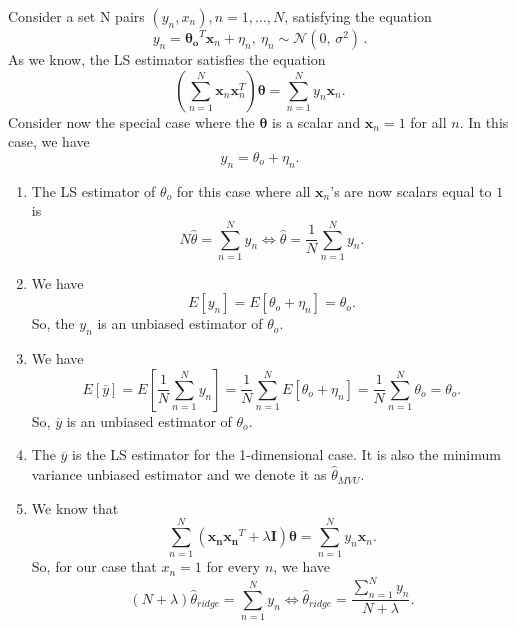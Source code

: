 \documentclass[12pt]{book}
\begin{document}
Consider a set N pairs $(y_n,x_n),n=1,\dots,N$, satisfying the equation
\begin{equation}
y_n = \bm{\theta_o}^T\bm{x}_n + \eta_n, \ \eta_n \sim \mathcal{N}(0,\,\sigma^{2})\,.
\end{equation}
As we know, the LS estimator satisfies the equation 
\begin{equation}
(\sum_{n=1}^{N}\bm{x}_n\bm{x}_n^T)\bm{\theta} = \sum_{n=1}^{N}y_n\bm{x}_n.
\end{equation}
Consider now the special case where the $\bm{\theta}$ is a scalar and $\bm{x}_n=1$ for all $n$. In this case, we have
\begin{equation}
y_n = \theta_o + \eta_n.
\end{equation}
\begin{enumerate}[label=(\alph*)]
	\item The LS estimator of $\theta_o$ for this case where all $\bm{x}_n$'s are now scalars equal to $1$ is
	\begin{equation*}
	N\hat{\theta} = \sum_{n=1}^{N} y_n \iff \hat{\theta}=\frac{1}{N} \sum_{n=1}^{N} y_n.
	\end{equation*}
	\item We have
	\begin{equation*}
	E[y_n]=E[\theta_o + \eta_n] = \theta_o.
	\end{equation*}
	So, the $y_n$ is an unbiased estimator of $\theta_o$.
	\item We have
	\begin{equation*}
	E[\overline{y}] = E[\frac{1}{N}\sum_{n=1}^{N}y_n] = \frac{1}{N}\sum_{n=1}^{N}E[\theta_o + \eta_n] = \frac{1}{N}\sum_{n=1}^{N} \theta_o = \theta_o.
	\end{equation*}
	So, $\overline{y}$ is an unbiased estimator of $\theta_o$.
	\item The $\overline{y}$ is the LS estimator for the 1-dimensional case. It is also the minimum variance unbiased estimator and we denote it as $\hat{\theta}_{MVU}$.
	\item We know that
	\begin{equation*}
	\sum_{n=1}^{N}(\mathbf{x_n}\mathbf{x_n}^T + \lambda \mathbf{I} )\bm{\theta} = \sum_{n=1}^{N}y_n\mathbf{x}_n.
	\end{equation*}
	So, for our case that $x_n=1$ for every $n$, we have
	\begin{equation*}
	(N + \lambda)\hat{\theta}_{ridge} = \sum_{n=1}^{N}y_n \iff \hat{\theta}_{ridge} = \frac{\sum_{n=1}^{N}y_n}{N+\lambda}.
	\end{equation*}

\end{enumerate}
\end{document}
